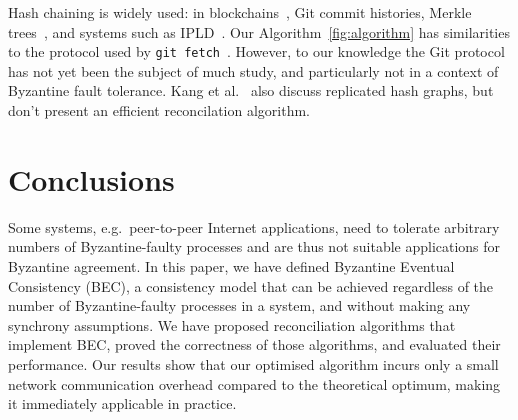 \documentclass[a4paper,anonymous,USenglish]{lipics-v2019}
\begin{document}
Hash chaining is widely used: in blockchains~\cite{Bano:2019}, Git commit histories, Merkle trees~\cite{Merkle:1987}, and systems such as IPLD~\cite{IPLD}.
Our Algorithm~\ref{fig:algorithm} has similarities to the protocol used by \texttt{git fetch}~\cite{GitHTTP}.
However, to our knowledge the Git protocol has not yet been the subject of much study, and particularly not in a context of Byzantine fault tolerance.
Kang et al.~\cite{Kang:2003} also discuss replicated hash graphs, but don't present an efficient reconcilation algorithm.










\section{Conclusions}

Some systems, e.g.\ peer-to-peer Internet applications, need to tolerate arbitrary numbers of Byzantine-faulty processes and are thus not suitable applications for Byzantine agreement.
In this paper, we have defined Byzantine Eventual Consistency (BEC), a consistency model that can be achieved regardless of the number of Byzantine-faulty processes in a system, and without making any synchrony assumptions.
We have proposed reconciliation algorithms that implement BEC, proved the correctness of those algorithms, and evaluated their performance.
Our results show that our optimised algorithm incurs only a small network communication overhead compared to the theoretical optimum, making it immediately applicable in practice.
\end{document}
